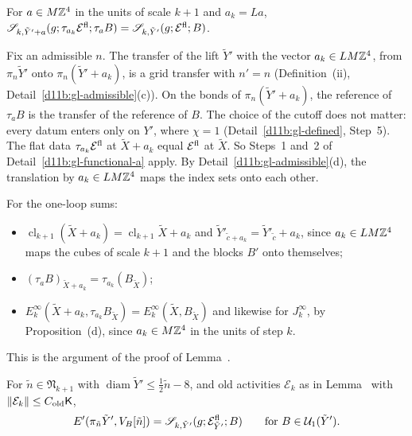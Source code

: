 \begin{detail}\label{d11b:gl-functional-b}
For $a\in M\mathbb Z^4$ in the units of scale $k+1$ and $a_k=La$, $\mathscr S_{k,\tilde Y'+a}(g;\tau_{a_k}\mathcal E^{\rm fl};\tau_aB)=\mathscr S_{k,\tilde Y'}(g;\mathcal E^{\rm fl};B)$.
\end{detail}

\begin{step}
Fix an admissible $n$. The transfer of the lift $\tilde Y'$ with the vector $a_k\in LM\mathbb Z^4$, from $\pi_n\tilde Y'$ onto $\pi_n(\tilde Y'+a_k)$, is a grid transfer with $n'=n$ (Definition~(ii), Detail~\ref{d11b:gl-admissible}(c)). On the bonds of $\pi_n(\tilde Y'+a_k)$, the reference of $\tau_aB$ is the transfer of the reference of $B$. The choice of the cutoff does not matter: every datum enters only on $Y'$, where $\chi=1$ (Detail~\ref{d11b:gl-defined}, Step~5). The flat data $\tau_{a_k}\mathcal E^{\rm fl}$ at $\tilde X+a_k$ equal $\mathcal E^{\rm fl}$ at $\tilde X$. So Steps~1 and~2 of Detail~\ref{d11b:gl-functional-a} apply. By Detail~\ref{d11b:gl-admissible}(d), the translation by $a_k\in LM\mathbb Z^4$ maps the index sets onto each other.

For the one-loop sums:
\begin{itemize}
\item $\operatorname{cl}_{k+1}(\tilde X+a_k)=\operatorname{cl}_{k+1}\tilde X+a_k$ and $\tilde Y'_{\tilde c+a_k}=\tilde Y'_{\tilde c}+a_k$, since $a_k\in LM\mathbb Z^4$ maps the cubes of scale $k+1$ and the blocks $B'$ onto themselves;
\item $(\tau_aB)_{\tilde X+a_k}=\tau_{a_k}(B_{\tilde X})$;
\item $E^\infty_k(\tilde X+a_k,\tau_{a_k}B_{\tilde X})=E^\infty_k(\tilde X,B_{\tilde X})$ and likewise for $J^\infty_k$, by Proposition~(d), since $a_k\in M\mathbb Z^4$ in the units of step $k$.
\end{itemize}
This is the argument of the proof of Lemma~.
\end{step}

\begin{detail}\label{d11b:gl-functional-c}
For $\tilde n\in\mathfrak N_{k+1}$ with $\operatorname{diam}\tilde Y'\le\frac12\tilde n-8$, and old activities $\mathcal E_k$ as in Lemma~ with $\|\mathcal E_k\|\le C_{\rm old}\mathsf K$,
\[
E'(\pi_{\tilde n}\tilde Y',V_B[\tilde n])=\mathscr S_{k,\tilde Y'}(g;\mathcal E^{\rm fl}_{\tilde Y'};B)\qquad\text{for }B\in\mathcal U_1(\tilde Y').
\]
\end{detail}

